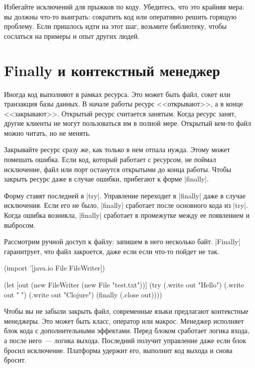 Избегайте исключений для прыжков по коду. Убедитесь, что это крайняя мера: вы
должны что-то выиграть: сократить код или оперативно решить горящую
проблему. Если пришлось идти на этот шаг, возьмите библиотеку, чтобы сослаться
на примеры и опыт других людей.


\section{Finally и контекстный менеджер}

Иногда код выполняют в рамках ресурса. Это может быть файл, сокет или транзакция
базы данных. В начале работы ресурс <<открывают>>, а в конце
<<закрывают>>. Открытый ресурс считается занятым. Когда ресурс занят, другие
клиенты не могут пользоваться им в полной мере. Открытый кем-то файл можно
читать, но не менять.

Закрывайте ресурс сразу же, как только в нем отпала нужда. Этому может помешать
ошибка. Если код, который работает с ресурсом, не поймал исключение, файл или
порт останутся открытыми до конца работы. Чтобы закрыть ресурс даже в случае
ошибки, прибегают к форме \spverb|finally|.

Форму ставят последней в \spverb|try|. Управление переходит в \spverb|finally|
даже в случае исключения. Если его не было, \spverb|finally| сработает после
основного кода из \spverb|try|. Когда ошибка возникла, \spverb|finally|
сработает в промежутке между ее появлением и выбросом.

Рассмотрим ручной доступ к файлу: запишем в него несколько
байт. \spverb|Finally| гаранитрует, что файл закроется, даже если если что-то
пойдет не так.

\begin{english}
  \begin{clojure}
(import '[java.io File FileWriter])

(let [out (new FileWriter (new File "test.txt"))]
  (try
    (.write out "Hello")
    (.write out " ")
    (.write out "Clojure")
    (finally
      (.close out))))
  \end{clojure}
\end{english}

Чтобы вы не забыли закрыть файл, современные языки предлагают контекстные
менеджеры. Это может быть класс, оператор или макрос. Менеджер исполняет блок
кода с дополнительными эффектами. Перед блоком сработает логика входа, а после
него~--- логика выхода. Последний получит управление даже если блок бросил
исключение. Платформа удержит его, выполнит код выхода и снова бросит.

